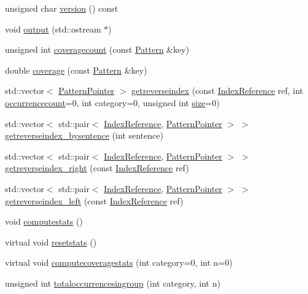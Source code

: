 \begin{DoxyCompactItemize}
\item 
unsigned char \hyperlink{classPatternModel_a30dac843287129d9d4c3c34459697835}{version} () const 
\item 
void \hyperlink{classPatternModel_ad3b35422f9af77624180503e01a5881a}{output} (std\+::ostream $\ast$)
\item 
unsigned int \hyperlink{classPatternModel_a561547f4abe74d2138683bf279eceea7}{coveragecount} (const \hyperlink{classPattern}{Pattern} \&key)
\item 
double \hyperlink{classPatternModel_acffbefd7321ff9cd4032a1033933ed7a}{coverage} (const \hyperlink{classPattern}{Pattern} \&key)
\item 
std\+::vector$<$ \hyperlink{classPatternPointer}{Pattern\+Pointer} $>$ \hyperlink{classPatternModel_a340deff272001ac6f791bec792a03b45}{getreverseindex} (const \hyperlink{classIndexReference}{Index\+Reference} ref, int \hyperlink{classPatternModel_a013725360804aac3514eb8bb436102db}{occurrencecount}=0, int category=0, unsigned int \hyperlink{classPatternModel_a2422cb944da209f399b3b10f3b1d2684}{size}=0)
\item 
std\+::vector$<$ std\+::pair$<$ \hyperlink{classIndexReference}{Index\+Reference}, \hyperlink{classPatternPointer}{Pattern\+Pointer} $>$ $>$ \hyperlink{classPatternModel_acef58dc3b555f4eeec6fe55f423dc369}{getreverseindex\+\_\+bysentence} (int sentence)
\item 
std\+::vector$<$ std\+::pair$<$ \hyperlink{classIndexReference}{Index\+Reference}, \hyperlink{classPatternPointer}{Pattern\+Pointer} $>$ $>$ \hyperlink{classPatternModel_a3d606eb9dfabd1c0ffba6e7b96d55cfc}{getreverseindex\+\_\+right} (const \hyperlink{classIndexReference}{Index\+Reference} ref)
\item 
std\+::vector$<$ std\+::pair$<$ \hyperlink{classIndexReference}{Index\+Reference}, \hyperlink{classPatternPointer}{Pattern\+Pointer} $>$ $>$ \hyperlink{classPatternModel_ab2318a00ce10d348356070e567a2be3d}{getreverseindex\+\_\+left} (const \hyperlink{classIndexReference}{Index\+Reference} ref)
\item 
void \hyperlink{classPatternModel_af27c14d58d1b7624cf6737645bd35d77}{computestats} ()
\item 
virtual void \hyperlink{classPatternModel_a287b8993ee50fe32bb87b9de0aab352d}{resetstats} ()
\item 
virtual void \hyperlink{classPatternModel_ace39c4eb87c43a1c1f1e38597e44edad}{computecoveragestats} (int category=0, int n=0)
\item 
unsigned int \hyperlink{classPatternModel_ab7b6a79389ff67ca5af7b51a9144406f}{totaloccurrencesingroup} (int category, int n)

\end{DoxyCompactItemize}
